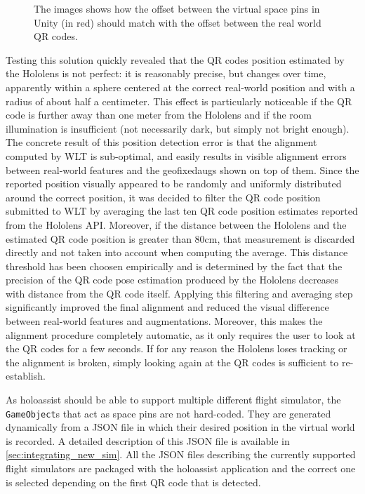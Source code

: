 \begin{figure}[b!]
  \centering
  \hfill
  \caption{The images shows how the offset between the virtual space pins in Unity (in red) should match with the offset between the real world QR codes.}\label{image:qr_codes_real_world_virtual_world.png}
\end{figure}

Testing this solution quickly revealed that the QR codes position estimated by the Hololens is not perfect: it is reasonably precise, but changes over time, apparently within a sphere centered at the correct real-world position and with a radius of about half a centimeter. This effect is particularly noticeable if the QR code is further away than one meter from the Hololens and if the room illumination is insufficient (not necessarily dark, but simply not bright enough). The concrete result of this position detection error is that the alignment computed by \gls{WLT} is sub-optimal, and easily results in visible alignment errors between real-world features and the \glspl{geofixedaug} shown on top of them. Since the reported position visually appeared to be randomly and uniformly distributed around the correct position, it was decided to filter the QR code position submitted to \gls{WLT} by averaging the last ten QR code position estimates reported from the Hololens \gls{API}. Moreover, if the distance between the Hololens and the estimated QR code position is greater than $80$cm, that measurement is discarded directly and not taken into account when computing the average. This distance threshold has been choosen empirically and is determined by the fact that the precision of the QR code pose estimation produced by the Hololens decreases with distance from the QR code itself. Applying this filtering and averaging step significantly improved the final alignment and reduced the visual difference between real-world features and augmentations. Moreover, this makes the alignment procedure completely automatic, as it only requires the user to look at the QR codes for a few seconds. If for any reason the Hololens loses tracking or the alignment is broken, simply looking again at the QR codes is sufficient to re-establish.

As \gls{holoassist} should be able to support multiple different flight simulator, the \texttt{GameObject}s that act as space pins are not hard-coded. They are generated dynamically from a JSON file in which their desired position in the virtual world is recorded. A detailed description of this JSON file is available in \autoref{sec:integrating_new_sim}. All the JSON files describing the currently supported flight simulators are packaged with the \gls{holoassist} application and the correct one is selected depending on the first QR code that is detected.

